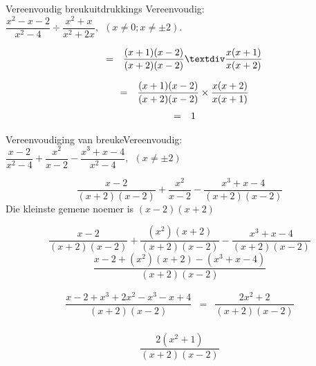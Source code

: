\clearpage
\begin{wex}{Vereenvoudig breukuitdrukkings }
{Vereenvoudig: $\dfrac{{x}^{2}-x-2}{{x}^{2}-4}÷\dfrac{{x}^{2}+x}{{x}^{2}+2x}, ~~(x \neq 0;x \neq \pm2)$.} 
{
\begin{equation*}
\begin{array}{ccc}& =& \dfrac{(x+1)(x-2)}{(x+2)(x-2)}÷\dfrac{x(x+1)}{x(x+2)}\hfill \end{array}
\end{equation*}


\begin{equation*}
\begin{array}{ccc}& =& \dfrac{(x+1)(x-2)}{(x+2)(x-2)}\ensuremath{\times}\dfrac{x(x+2)}{x(x+1)}\hfill \end{array}
\end{equation*}
\begin{equation*}
\begin{array}{ccc}& =& 1\hfill \end{array}
\end{equation*}
}
\end{wex}


%      
\begin{wex}{Vereenvoudiging van breuke}{Vereenvoudig: $\dfrac{x-2}{{x}^{2}-4}+\dfrac{{x}^{2}}{x-2}-\dfrac{{x}^{3}+x-4}{{x}^{2}-4}, ~~(x \neq \pm2)$}
{
\begin{equation*}
\frac{x-2}{(x+2)(x-2)}+\frac{{x}^{2}}{x-2}-\frac{{x}^{3}+x-4}{(x+2)(x-2)}
\end{equation*}
 Die kleinste gemene noemer is $(x-2)(x+2)$\par 

\begin{equation*}
\frac{x-2}{(x+2)(x-2)}+\frac{({x}^{2})
(x+2)}{(x+2)(x-2)}-\frac{{x}^{3}+x-4}{(x+2)(x-2)}
\end{equation*}
\begin{equation*}
\frac{x-2+({x}^{2})(x+2)-(x^{3}+x-4)}{(x+2)(x-2)}
\end{equation*}

\begin{equation*}
 \begin{array}{llll}
\dfrac{x-2+{x}^{3}+ 2x^{2}-x^{3} - x+4}{(x+2)(x-2)} & = & \dfrac{2x^{2} + 2}{(x+2)(x-2)}\\
\end{array}
\end{equation*}

\begin{equation*}
\dfrac{2({x}^{2}
+1)}{(x+2)(x-2)}
\end{equation*}
}
\end{wex}

